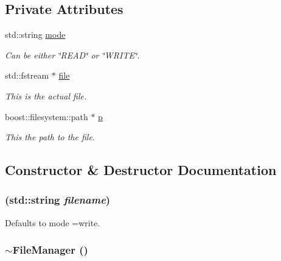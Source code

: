 \subsection*{Private Attributes}
\begin{DoxyCompactItemize}
\item 
std::string \hyperlink{classJKBuilder_1_1FileManager_a6c71000b535e65812d96eee3386307c4}{mode}
\begin{DoxyCompactList}\small\item\em Can be either \char`\"{}READ\char`\"{} or \char`\"{}WRITE\char`\"{}. \item\end{DoxyCompactList}\item 
std::fstream $\ast$ \hyperlink{classJKBuilder_1_1FileManager_a48c4cd5efd7b8b98629f1cd343d977a5}{file}
\begin{DoxyCompactList}\small\item\em This is the actual file. \item\end{DoxyCompactList}\item 
boost::filesystem::path $\ast$ \hyperlink{classJKBuilder_1_1FileManager_ac00a0f5150a654e2c127753617a833c8}{p}
\begin{DoxyCompactList}\small\item\em This the path to the file. \item\end{DoxyCompactList}\end{DoxyCompactItemize}


\subsection{Constructor \& Destructor Documentation}
\hypertarget{classJKBuilder_1_1FileManager_ad2b836abb993359aa5ee2cdaaf647a7f}{
\subsubsection[{FileManager}]{ (std::string {\em filename})}}
\label{classJKBuilder_1_1FileManager_ad2b836abb993359aa5ee2cdaaf647a7f}


Defaults to mode =write. \hypertarget{classJKBuilder_1_1FileManager_acb45faebe31bb3a16cf5bf9e031a8f08}{
\subsubsection[{$\sim$FileManager}]{\setlength{\rightskip}{0pt plus 5cm}$\sim${\bf FileManager} ()}}
\label{classJKBuilder_1_1FileManager_acb45faebe31bb3a16cf5bf9e031a8f08}


